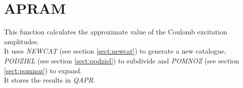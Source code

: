 \section{APRAM}
\label{sect:apram}

\noindent This function calculates the approximate value of the Coulomb
excitation amplitudes.\\

\noindent It uses {\em NEWCAT} (see section \ref{sect:newcat}) to
generate a new catalogue, {\em PODZIEL} (see section
\ref{sect:podziel}) to subdivide and {\em POMNOZ} (see section
\ref{sect:pomnoz}) to expand.\\

\noindent It stores the results in {\em QAPR}.\\

